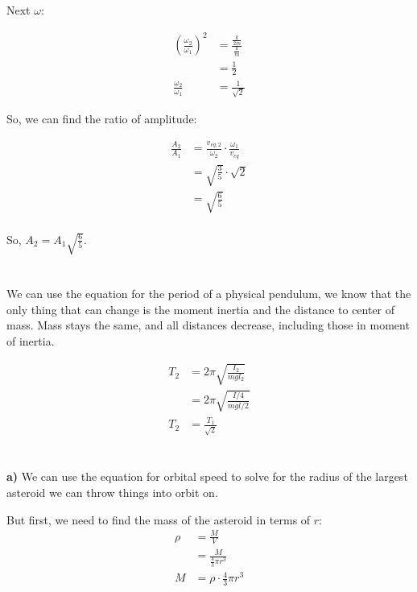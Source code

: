 \documentclass{article}
\begin{document}
Next $\omega$:

\begin{align*}
    \left(\frac{\omega_2}{\omega_1}\right)^2 &= \frac{\frac{k}{2m}}{\frac{k}{m}} \\
    &= \frac{1}{2} \\
    \frac{\omega_2}{\omega_1} &= \frac{1}{\sqrt{2}}
\end{align*}

So, we can find the ratio of amplitude:

\begin{align*}
    \frac{A_2}{A_1} &= \frac{v_{eq,2}}{\omega_2}\cdot\frac{\omega_1}{v_{eq}} \\
    &= \sqrt{\frac{3}{5}}\cdot\sqrt{2} \\
    &= \sqrt{\frac{6}{5}} \\
\end{align*}

So, $A_2 = A_1\sqrt{\frac{6}{5}}$.

\newpage
\section{}

We can use the equation for the period of a physical pendulum, we know that the only thing that can change is the moment inertia and the distance to center of mass. Mass stays the same, and all distances decrease, including those in moment of inertia.

\begin{align*}
    T_2 &= 2\pi\sqrt{\frac{I_2}{mgl_2}} \\
    &= 2\pi\sqrt{\frac{I/4}{mgl/2}} \\
    T_2 &= \frac{T_1}{\sqrt{2}}
\end{align*}

\newpage
\section{}

\textbf{a)} We can use the equation for orbital speed to solve for the radius of the largest asteroid we can throw things into orbit on.

But first, we need to find the mass of the asteroid in terms of $r$:
\begin{align*}
    \rho &= \frac{M}{V} \\
    &= \frac{M}{\frac{4}{3}\pi r^3} \\
    M &= \rho\cdot\frac{4}{3}\pi r^3 \\
\end{align*}
\end{document}
